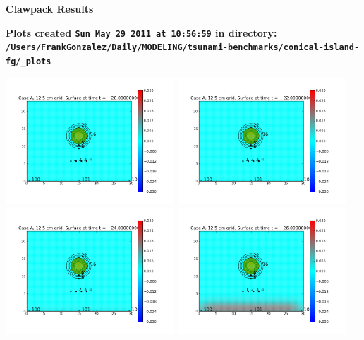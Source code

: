 \documentclass[11pt]{article}
\begin{document}
        \begin{center}{\Large\bf Clawpack Results}\vskip 5pt
        
        \bf Plots created {\tt Sun May 29 2011 at 10:56:59} in directory: \vskip 5pt
        \verb+/Users/FrankGonzalez/Daily/MODELING/tsunami-benchmarks/conical-island-fg/_plots+
        \end{center}
        \vskip 5pt
        \includegraphics[width=0.475\textwidth]{frame0000fig0.png}
\vskip 10pt 
\includegraphics[width=0.475\textwidth]{frame0001fig0.png}
\vskip 10pt 
\includegraphics[width=0.475\textwidth]{frame0002fig0.png}
\vskip 10pt 
\includegraphics[width=0.475\textwidth]{frame0003fig0.png}
\end{document}
